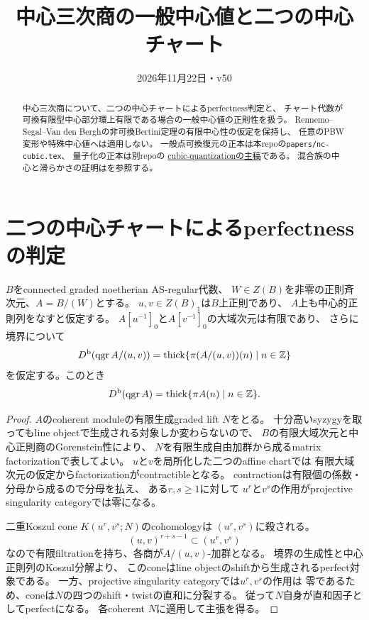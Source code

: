
\providecommand{\gldim}{\operatorname{gldim}}
\providecommand{\Db}{D^{\mathrm b}}
\title{中心三次商の一般中心値と二つの中心チャート}
\author{}
\date{2026年11月22日・v50}

\maketitle
\begin{abstract}
中心三次商について、二つの中心チャートによるperfectness判定と、
チャート代数が可換有限型中心部分環上有限である場合の一般中心値の正則性を扱う。
Rennemo--Segal--Van den Berghの非可換Bertini定理の有限中心性の仮定を保持し、
任意のPBW変形や特殊中心値へは適用しない。
一般点可換復元の正本は本repoの\texttt{papers/nc-cubic.tex}、
量子化の正本は別repoの
\href{https://github.com/uedakazushi/cubic-quantization/blob/main/papers/cubic-quantization.tex}{cubic-quantizationの主稿}である。
混合族の中心と滑らかさの証明はを参照する。
\end{abstract}

\section{二つの中心チャートによるperfectnessの判定}
\begin{proposition}[二つの中心チャート]\label{prop:patch}
$B$をconnected graded noetherian AS-regular代数、
$W\in Z(B)$を非零の正則斉次元、$A=B/(W)$とする。
$u,v\in Z(B)_1$は$B$上正則であり、
$A$上も中心的正則列をなすと仮定する。
$A[u^{-1}]_0$と$A[v^{-1}]_0$の大域次元は有限であり、
さらに境界について
\[
\Db(\qgr A/(u,v))
=\thick\{\pi(A/(u,v))(n)\mid n\in\mathbb Z\}
\]
を仮定する。このとき
\[
\Db(\qgr A)=\thick\{\pi A(n)\mid n\in\mathbb Z\}.
\]
\end{proposition}
\begin{proof}
$A$のcoherent moduleの有限生成graded lift $N$をとる。
十分高いsyzygyを取ってもline objectで生成される対象しか変わらないので、
$B$の有限大域次元と中心正則商のGorenstein性により、
$N$を有限生成自由加群から成るmatrix factorizationで表してよい。
$u$と$v$を局所化した二つのaffine chartでは
有限大域次元の仮定からfactorizationがcontractibleとなる。
contractionは有限個の係数・分母から成るので分母を払え、
ある$r,s\ge1$に対して
$u^r$と$v^s$の作用がprojective singularity categoryでは零になる。

二重Koszul cone $K(u^r,v^s;N)$のcohomologyは
$(u^r,v^s)$に殺される。
\[
(u,v)^{r+s-1}\subset (u^r,v^s)
\]
なので有限filtrationを持ち、各商が$A/(u,v)$-加群となる。
境界の生成性と中心正則列のKoszul分解より、
このconeはline objectのshiftから生成されるperfect対象である。
一方、projective singularity categoryでは$u^r,v^s$の作用は
零であるため、coneは$N$の四つのshift・twistの直和に分裂する。
従って$N$自身が直和因子としてperfectになる。
各coherent $N$に適用して主張を得る。
\end{proof}

